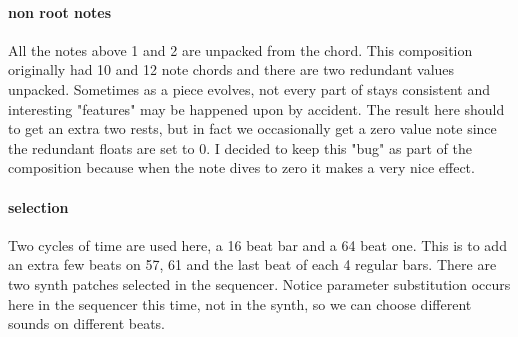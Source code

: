\paragraph{non root notes}
All the notes above 1 and 2 are unpacked from the chord. This composition
originally had 10 and 12 note chords and there are two redundant
values unpacked. Sometimes as a piece evolves, not every
part of stays consistent and interesting "features" may be
happened upon by accident. The result here should to get an extra two
rests, but in fact we occasionally get a zero value note since the redundant floats
are set to 0. I decided to keep this "bug" as part of the composition because
when the note dives to zero it makes a very nice effect.

\paragraph{selection}
Two cycles of time are used here, a 16 beat bar and a 64 beat one. This is 
to add an extra few beats on 57, 61 and the last beat of each 4 regular
bars. There are two synth patches selected in the sequencer. Notice parameter substitution 
occurs here in the sequencer this time, not in the synth, so we can choose different sounds
on different beats.